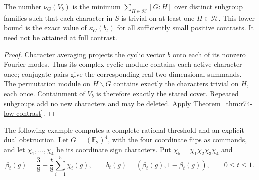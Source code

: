 \begin{corollary}
\label{cor:r74-abelian-cover}
The number $\nu_G(V_b)$ is the minimum
$\sum_{H\in\mathcal H}[G:H]$ over distinct subgroup families such that
each character in $S$ is trivial on at least one $H\in\mathcal H$.
This lower bound is the exact value of $\kappa_G(b_t)$ for all sufficiently
small positive contrasts. It need not be attained at full contrast.
\end{corollary}
\begin{proof}
Character averaging projects the cyclic vector $b$ onto each of its
nonzero Fourier modes. Thus its complex cyclic module contains each
active character once; conjugate pairs give the corresponding real
two-dimensional summands. The permutation module on $H\backslash G$
contains exactly the characters trivial on $H$, each once. Containment
of $V_b$ is therefore exactly the stated cover. Repeated subgroups add no
new characters and may be deleted. Apply
Theorem~\ref{thm:r74-low-contrast}.
\end{proof}

The following example computes a complete rational threshold and an explicit
dual obstruction. Let $G=(\mathbb F_2)^4$, with the four coordinate flips as
commands, and let $\chi_1,\ldots,\chi_4$ be its coordinate sign characters.
Put $\chi_5=\chi_1\chi_2\chi_3\chi_4$ and
\begin{equation}\label{eq:r74-five-character-response}
 \beta_t(g)=\frac38+\frac t8\sum_{i=1}^5\chi_i(g),\qquad
 b_t(g)=(\beta_t(g),1-\beta_t(g)),\qquad 0\le t\le1.
\end{equation}

